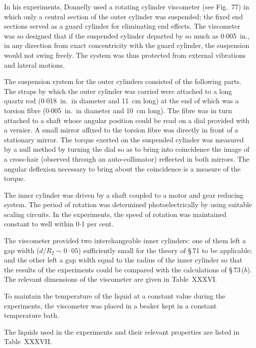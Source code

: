 In his experiments, Donnelly used a rotating cylinder viscometer (see
Fig.~77) in which only a central section of the outer cylinder was sus\-pended;
the fixed end sections served as a guard cylinder for eliminating
end effects.  The viscometer was so designed that if the suspended
cylinder departed by so much as 0$\cdot$005~in., in any direction from exact
concentricity with the guard cylinder, the suspension would not swing
freely.  The system was thus protected from external vibrations and
lateral motions.


The suspension system for the outer cylinders consisted of the follow\-ing
parts.  The straps by which the outer cylinder was carried were
attached to a long quartz rod (0$\cdot$018~in.\ in diameter and 11~cm long) at
the end of which was a torsion fibre (0$\cdot$005~in.\ in diameter and 10~cm long).
The fibre was in turn attached to a shaft whose angular position could be
read on a dial provided with a vernier.  A small mirror affixed to the
torsion fibre was directly in front of a stationary mirror.  The torque
exerted on the suspended cylinder was measured by a null method by
turning the dial so as to bring into coincidence the image of a cross-hair
(observed through an auto-collimator) reflected in both mirrors.  The
angular deflexion necessary to bring about the coincidence is a measure
of the torque.

The inner cylinder was driven by a shaft coupled to a motor and gear
reducing system.  The period of rotation was determined photo\-electrically
by using suitable scaling circuits.  In the experiments, the
speed of rotation was maintained constant to well within 0$\cdot$1 per cent.

The viscometer provided two interchangeable inner cylinders: one of
them left a gap width ($d/R_2 \sim 0{\cdot}05$) sufficiently small for the theory
of \S\,71 to be applicable; and the other left a gap width equal to the radius
of the inner cylinder so that the results of the experiments could be
compared with the calculations of \S\,73\,($b$).  The relevant dimensions
of the viscometer are given in Table~XXXVI.

To maintain the temperature of the liquid at a constant value during
the experiments, the viscometer was placed in a beaker kept in a constant
temperature bath.

The liquids used in the experiments and their relevant properties are
listed in Table~XXXVII.

